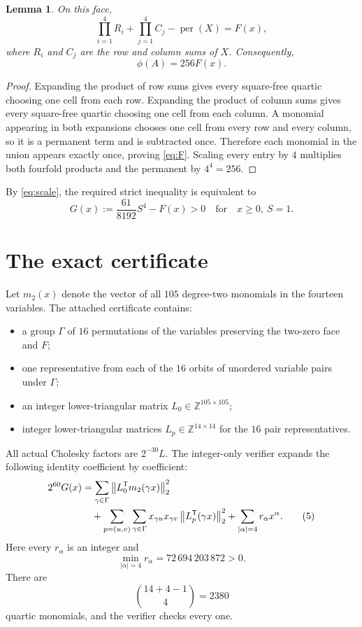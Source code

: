 \documentclass[11pt]{article}
\newtheorem{lemma}[theorem]{Lemma}
\newcommand{\permanent}{\operatorname{per}}
\begin{document}
\begin{lemma}\label{lem:hypergraph}
On this face,
\[
 \prod_{i=1}^{4}R_i+\prod_{j=1}^{4}C_j-\permanent(X)=F(x),
\]
where $R_i$ and $C_j$ are the row and column sums of $X$. Consequently,
\[
 \phi(A)=256F(x).
 \tag{3}\label{eq:scale}
\]
\end{lemma}

\begin{proof}
Expanding the product of row sums gives every square-free quartic choosing one cell from each row. Expanding the product of column sums gives every square-free quartic choosing one cell from each column. A monomial appearing in both expansions chooses one cell from every row and every column, so it is a permanent term and is subtracted once. Therefore each monomial in the union appears exactly once, proving \eqref{eq:F}. Scaling every entry by $4$ multiplies both fourfold products and the permanent by $4^4=256$.
\end{proof}

By \eqref{eq:scale}, the required strict inequality is equivalent to
\[
 G(x):=\frac{61}{8192}S^4-F(x)>0
 \quad\text{for}\quad x\ge0,\ S=1.
 \tag{4}\label{eq:G}
\]

\section{The exact certificate}
Let $m_2(x)$ denote the vector of all $105$ degree-two monomials in the fourteen variables. The attached certificate contains:
\begin{itemize}[nosep]
 \item a group $\Gamma$ of $16$ permutations of the variables preserving the two-zero face and $F$;
 \item one representative from each of the $16$ orbits of unordered variable pairs under $\Gamma$;
 \item an integer lower-triangular matrix $L_0\in\mathbb Z^{105\times105}$;
 \item integer lower-triangular matrices $L_p\in\mathbb Z^{14\times14}$ for the $16$ pair representatives.
\end{itemize}
All actual Cholesky factors are $2^{-30}L$. The integer-only verifier expands the following identity coefficient by coefficient:
\begin{align}
 2^{60}G(x)
 &=\sum_{\gamma\in\Gamma}
      \left\|L_0^{\mathsf T}m_2(\gamma x)\right\|_2^2 \notag\\
 &\quad+\sum_{p=(u,v)}\sum_{\gamma\in\Gamma}
      x_{\gamma u}x_{\gamma v}
      \left\|L_p^{\mathsf T}(\gamma x)\right\|_2^2
   +\sum_{|\alpha|=4}r_\alpha x^\alpha.
 \tag{5}\label{eq:certificate}
\end{align}
Here every $r_\alpha$ is an integer and
\[
 \min_{|\alpha|=4}r_\alpha=72\,694\,203\,872>0.
 \tag{6}\label{eq:minres}
\]
There are
\[
 \binom{14+4-1}{4}=2380
\]
quartic monomials, and the verifier checks every one.
\end{document}
